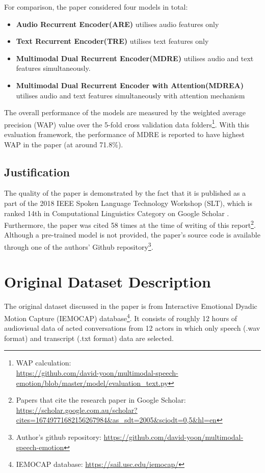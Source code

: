 \documentclass{article}
\newenvironment{subs}
  {\adjustwidth{3em}{0pt}}
  {\endadjustwidth}
\begin{document}
    For comparison, the paper considered four models in total:
    \begin{itemize}
        \item \textbf{Audio Recurrent Encoder(ARE)} utilises audio features only
        \item \textbf{Text Recurrent Encoder(TRE)} utilises text features only
        \item \textbf{Multimodal Dual Recurrent Encoder(MDRE)} utilises audio and text features simultaneously.
        \item \textbf{Multimodal Dual Recurrent Encoder with Attention(MDREA)} utilises audio and text features simultaneously with attention mechanism
    \end{itemize}
    
    The overall performance of the models are measured by the weighted average precision (WAP) value over the 5-fold cross validation data folders\footnote{WAP calculation:\\ \url{https://github.com/david-yoon/multimodal-speech-emotion/blob/master/model/evaluation_text.py}}. With this evaluation framework, the performance of MDRE is reported to have highest WAP in the paper (at around 71.8\%).\par

\begin{subs}
    \subsection{Justification}
        The quality of the paper is demonstrated by the fact that it is published as a part of the 2018 IEEE Spoken Language Technology Workshop (SLT), which is ranked 14th in Computational Linguistics Category on Google Scholar \cite{Google Scholar Computation linguistics}. Furthermore, the paper was cited 58 times at the time of writing of this report\footnote{Papers that cite the research paper in Google Scholar:\\ \url{https://scholar.google.com.au/scholar?cites=16749771682156267984&as_sdt=2005&sciodt=0,5&hl=en}}. Although a pre-trained model is not provided, the paper's source code is available through one of the authors' Github repository\footnote{Author's github repository:  \url{https://github.com/david-yoon/multimodal-speech-emotion}}. 
\end{subs}

\section{Original Dataset Description}
    The original dataset discussed in the paper is from Interactive Emotional Dyadic Motion Capture (IEMOCAP) database\footnote{IEMOCAP database: \url{https://sail.usc.edu/iemocap/}}. It consists of roughly 12 hours of audiovisual data of acted conversations from 12 actors in which only speech (.wav format) and transcript (.txt format) data are selected.\par
\end{document}
